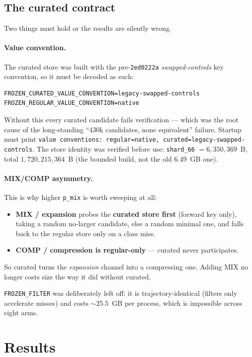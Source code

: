 \documentclass[11pt]{article}
\begin{document}
\subsection{The curated contract}

Two things must hold or the results are silently wrong.

\paragraph{Value convention.} The curated store was built with the
pre-\texttt{2ed0222a} \emph{swapped-controls} key convention, so it must be
decoded as such:
\begin{verbatim}
FROZEN_CURATED_VALUE_CONVENTION=legacy-swapped-controls
FROZEN_REGULAR_VALUE_CONVENTION=native
\end{verbatim}
Without this every curated candidate fails verification --- which was the root
cause of the long-standing ``430k candidates, none equivalent'' failure.
Startup must print
\texttt{value conventions: regular=native, curated=legacy-swapped-controls}.
The store identity was verified before use: \texttt{shard\_66} $=6{,}350{,}369$~B,
total $1{,}720{,}215{,}364$~B (the bounded build, not the old 6.49~GB one).

\paragraph{MIX/COMP asymmetry.} This is why higher \texttt{p\_mix} is worth
sweeping at all:
\begin{itemize}
\item \textbf{MIX / expansion} probes the \textbf{curated store first} (forward
key only), taking a random no-larger candidate, else a random minimal one, and
falls back to the regular store only on a class miss.
\item \textbf{COMP / compression is regular-only} --- curated never participates.
\end{itemize}
So curated turns the \emph{expansion} channel into a compressing one. Adding MIX
no longer costs size the way it did without curated.

\texttt{FROZEN\_FILTER} was deliberately left off: it is trajectory-identical
(filters only accelerate misses) and costs ${\sim}25.5$~GB per process, which is
impossible across eight arms.

\section{Results}
\end{document}
